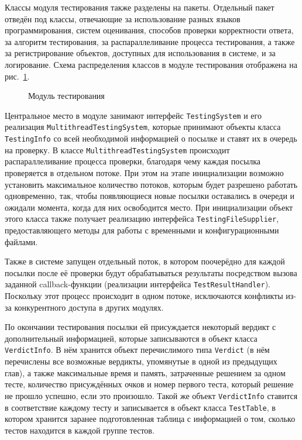 Классы модуля тестирования также разделены на пакеты. Отдельный пакет отведён под классы, отвечающие за использование разных языков программирования, систем оценивания, способов проверки корректности ответа, за алгоритм тестирования, за распараллеливание процесса тестирования, а также за регистрирование объектов, доступных для использования в системе, и за логирование. Схема распределения классов в модуле тестирования отображена на рис.~\ref{package_diagram_testing}.

\begin{figure}[h]
\caption{Модуль тестирования}
\label{package_diagram_testing}
\end{figure}

Центральное место в модуле занимают интерфейс \texttt{Testing\-System} и его реализация \texttt{Multithread\-Testing\-System}, которые принимают объекты класса \texttt{Tes\-ting\-Info} со всей необходимой информацией о посылке и ставят их в очередь на проверку. В классе \texttt{Multithread\-Testing\-System} происходит распараллеливание процесса проверки, благодаря чему каждая посылка проверяется в отдельном потоке. При этом на этапе инициализации возможно установить максимальное количество потоков, которым будет разрешено работать одновременно, так, чтобы появляющиеся новые посылки оставались в очереди и ожидали момента, когда для них освободится место. При инициализации объект этого класса также получает реализацию интерфейса \texttt{Testing\-File\-Supplier}, предоставляющего методы для работы с временными и конфигурационными файлами.

Также в системе запущен отдельный поток, в котором поочерёдно для каждой посылки после её проверки будут обрабатываться результаты посредством вызова заданной callback-функции (реализации интерфейса \texttt{Test\-Result\-Handler}). Поскольку этот процесс происходит в одном потоке, исключаются конфликты из-за конкурентного доступа в других модулях.

По окончании тестирования посылки ей присуждается некоторый вердикт с дополнительный информацией, которые записываются в объект класса \texttt{Verdict\-Info}. В нём хранится объект перечислимого типа \texttt{Verdict} (в нём перечислены все возможные вердикты, упомянутые в одной из предыдущих глав), а также максимальные время и память, затраченные решением за одном тесте, количество присуждённых очков и номер первого теста, который решение не прошло успешно, если это произошло. Такой же объект \texttt{Verdict\-Info} ставится в соответствие каждому тесту и записывается в объект класса \texttt{Test\-Table}, в котором хранится заранее подготовленная таблица с информацией о том, сколько тестов находится в каждой группе тестов.

